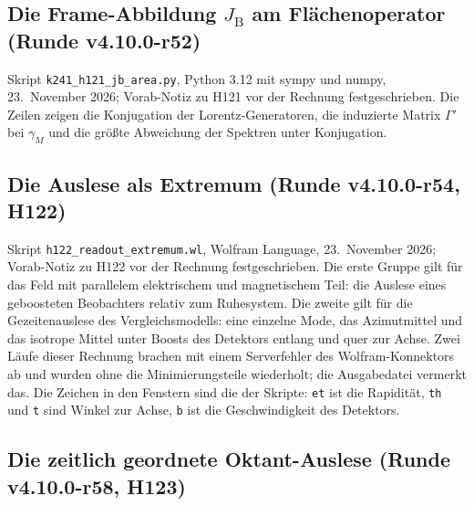 \subsection{Die Frame-Abbildung \texorpdfstring{\(J_{\mathrm B}\)}{JB} am Flächenoperator (Runde v4.10.0-r52)}
\label{app:new-jb}

Skript \texttt{k241\_\allowbreak h121\_\allowbreak jb\_\allowbreak area.py}, Python 3.12 mit sympy und numpy, 23.~November 2026;
Vorab-Notiz zu H121 vor der Rechnung festgeschrieben. Die Zeilen zeigen die Konjugation der Lorentz-Generatoren, die induzierte
Matrix \(\Gamma'\) bei \(\gamma_M\) und die größte Abweichung der Spektren unter Konjugation.

\subsection{Die Auslese als Extremum (Runde v4.10.0-r54, H122)}
\label{app:new-readout}

Skript \texttt{h122\_\allowbreak readout\_\allowbreak extremum.wl}, Wolfram Language, 23.~November 2026; Vorab-Notiz zu H122 vor der
Rechnung festgeschrieben. Die erste Gruppe gilt für das Feld mit parallelem elektrischem und magnetischem Teil: die Auslese eines
geboosteten Beobachters relativ zum Ruhesystem. Die zweite gilt für die Gezeitenauslese des Vergleichsmodells: eine einzelne Mode, das
Azimutmittel und das isotrope Mittel unter Boosts des Detektors entlang und quer zur Achse.
Zwei Läufe dieser Rechnung brachen mit einem Serverfehler des Wolfram-Konnektors ab und wurden ohne die Minimierungsteile wiederholt; die
Ausgabedatei vermerkt das. Die Zeichen in den Fenstern sind die der Skripte: \texttt{et} ist die Rapidität, \texttt{th} und \texttt{t}
sind Winkel zur Achse, \texttt{b} ist die Geschwindigkeit des Detektors.

\subsection{Die zeitlich geordnete Oktant-Auslese (Runde v4.10.0-r58, H123)}
\label{app:new-temporal}

